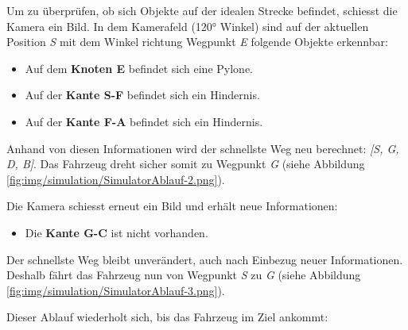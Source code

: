 \documentclass[../main.tex]{subfiles}
\begin{document}

Um zu überprüfen, ob sich Objekte auf der idealen Strecke befindet, schiesst die Kamera ein Bild. In dem Kamerafeld (120° Winkel) sind auf der aktuellen Position \textit{S} mit dem Winkel richtung Wegpunkt \textit{E} folgende Objekte erkennbar:
\begin{itemize}
    \item Auf dem \textbf{Knoten E} befindet sich eine Pylone.
    \item Auf der \textbf{Kante S-F} befindet sich ein Hindernis.
    \item Auf der \textbf{Kante F-A} befindet sich ein Hindernis.
\end{itemize}

Anhand von diesen Informationen wird der schnellste Weg neu berechnet: \textit{[S, G, D, B]}. Das Fahrzeug dreht sicher somit zu Wegpunkt \textit{G} (siehe Abbildung \ref{fig:img/simulation/SimulatorAblauf-2.png}). 


Die Kamera schiesst erneut ein Bild und erhält neue Informationen:
\begin{itemize}
    \item Die \textbf{Kante G-C} ist nicht vorhanden.
\end{itemize}

Der schnellste Weg bleibt unverändert, auch nach Einbezug neuer Informationen.
Deshalb fährt das Fahrzeug nun von Wegpunkt \textit{S} zu \textit{G} (siehe Abbildung \ref{fig:img/simulation/SimulatorAblauf-3.png}).


Dieser Ablauf wiederholt sich, bis das Fahrzeug im Ziel ankommt:
\end{document}
